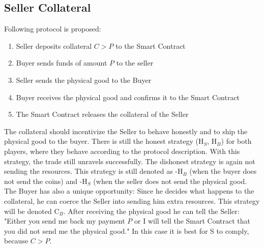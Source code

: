 \documentclass{cacthesis}
\begin{document}
\subsection{Seller Collateral}
Following protocol is proposed:
\begin{enumerate}
    \item Seller deposits collateral $C > P$ to the Smart Contract
    \item Buyer sends funds of amount $P$ to the seller 
    \item Seller sends the physical good to the Buyer
    \item Buyer receives the physical good and confirms it to the Smart Contract
    \item The Smart Contract releases the collateral of the Seller
\end{enumerate}
The collateral should incentivize the Seller to behave honestly and to ship the physical good to the buyer.
There is still the honest strategy (H$_S$, H$_B$) for both players, where they behave according to the protocol description. With this strategy, the trade still unravels successfully.\newline
The dishonest strategy is again not sending the resources. This strategy is still denoted as -H$_B$ (when the buyer does not send the coins) and -H$_S$ (when the seller does not send the physical good.\newline
The Buyer has also a unique opportunity: Since he decides what happens to the collateral, he can coerce the Seller into sending him extra resources. This strategy will be denoted C$_B$.  After receiving the physical good he can tell the Seller: "Either you send me back my payment $P$ or I will tell the Smart Contract that you did not send me the physical good." In this case it is best for S to comply, because $C > P$. \newline




\end{document}
